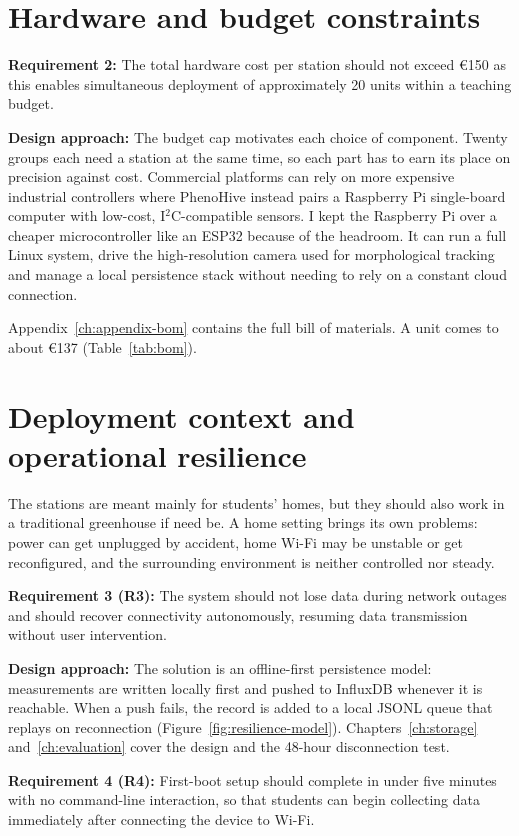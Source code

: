 \section{Hardware and budget constraints}

\textbf{Requirement 2:} The total hardware cost per station should not exceed €150 as this enables simultaneous deployment of approximately 20 units within a teaching budget.

\textbf{Design approach:} The budget cap motivates each choice of component. Twenty groups each need a station at the same time, so each part has to earn its place on precision against cost. Commercial platforms can rely on more expensive industrial controllers where PhenoHive instead pairs a Raspberry Pi single-board computer with low-cost, I$^2$C-compatible sensors. I kept the Raspberry Pi over a cheaper microcontroller like an ESP32 because of the headroom. It can run a full Linux system, drive the high-resolution camera used for morphological tracking and manage a local persistence stack without needing to rely on a constant cloud connection.

Appendix~\ref{ch:appendix-bom} contains the full bill of materials. A unit comes to about €137 (Table~\ref{tab:bom}).


\section{Deployment context and operational resilience}

The stations are meant mainly for students' homes, but they should also work in a traditional greenhouse if need be. A home setting brings its own problems: power can get unplugged by accident, home Wi-Fi may be unstable or get reconfigured, and the surrounding environment is neither controlled nor steady.

\textbf{Requirement 3 (R3):} The system should not lose data during network outages and should recover connectivity autonomously, resuming data transmission without user intervention.

\textbf{Design approach:} The solution is an offline-first persistence model: measurements are written locally first and pushed to InfluxDB whenever it is reachable. When a push fails, the record is added to a local JSONL queue that replays on reconnection (Figure~\ref{fig:resilience-model}). Chapters~\ref{ch:storage} and~\ref{ch:evaluation} cover the design and the 48-hour disconnection test.

\textbf{Requirement 4 (R4):} First-boot setup should complete in under five minutes with no command-line interaction, so that students can begin collecting data immediately after connecting the device to Wi-Fi.

